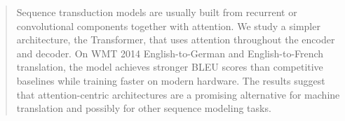 \begin{abstract}
Sequence transduction models are usually built from recurrent or convolutional components together with attention. We study a simpler architecture, the Transformer, that uses attention throughout the encoder and decoder. On WMT 2014 English-to-German and English-to-French translation, the model achieves stronger BLEU scores than competitive baselines while training faster on modern hardware. The results suggest that attention-centric architectures are a promising alternative for machine translation and possibly for other sequence modeling tasks.
\end{abstract}
